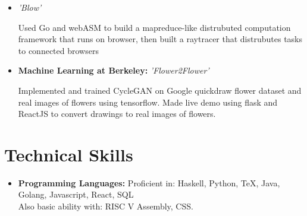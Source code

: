 \documentclass[11pt,letterpaper,sans]{moderncv}        %
\begin{document}
\begin{itemize}

\item{\textit{'Blow'}

\vspace{3pt}
\small{Used Go and webASM to build a mapreduce-like distrubuted computation framework that runs on browser, then built a raytracer that distrubutes tasks to connected browsers}}
\iffalse 
\item{\textbf{Developer Camp Best Education Hack:} \textit{'Splash Game'}

\vspace{3pt}

\small{Used Pixi Library to create a Javascript infinite runner game to teach children about the water cycle and the importance of conservation}}
\fi
\item{\textbf{Machine Learning at Berkeley:} \textit{'Flower2Flower'}

\vspace{3pt}

        \small{Implemented and trained CycleGAN on Google quickdraw flower dataset and real images of flowers using tensorflow. Made live demo using flask and ReactJS to convert drawings to real images of flowers.}}
\end{itemize}

\section{Technical Skills}

\vspace{3pt}

\begin{itemize}

\item \textbf{Programming Languages:} Proficient in: Haskell, Python, TeX, Java, Golang, Javascript, React, SQL \\ Also basic ability with: RISC V Assembly, CSS.

\end{itemize}


\nocite{*}



\end{document}
